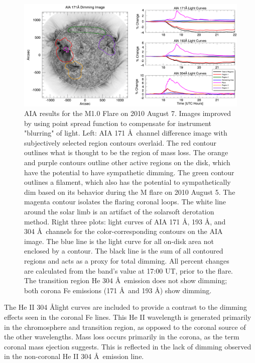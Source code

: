 \begin{figure}[!h]
    \begin{center}
	    \includegraphics[width=166mm]{Images/Aia2010Aug7.png}
    \end{center}
    \caption[AIA contour analysis for 2010 August 7 event]{
        AIA results for the M1.0 Flare on 2010 August 7. Images improved by using point spread function to compensate for 
        instrument "blurring" of light. Left: AIA 171 \AA\ channel difference image with subjectively 
        selected region contours overlaid. The red contour outlines what is thought to be the region of mass loss. The 
        orange and purple contours outline other active regions on the disk, which have the potential to have sympathetic 
        dimming. The green contour outlines a filament, which also has the potential to sympathetically dim based on its 
        behavior during the M flare on 2010 August 5. The magenta contour isolates the flaring coronal loops. The white line 
        around the solar limb is an artifact of the solarsoft derotation method. Right three plots: light curves of AIA 171 
        \AA, 193 \AA, and 304 \AA\ channels for the color-corresponding contours on the AIA image. The blue line is the 
        light curve for all on-disk area not enclosed by a contour. The black line is the sum of all contoured regions and 
        acts as a proxy for total dimming. All percent changes are calculated from the band’s value at 17:00 UT, prior to 
        the flare. The transition region He 304 \AA\ emission does not show dimming; both corona Fe emissions (171 \AA\ and 
        193 \AA) show dimming.
	}
    \label{aia2010aug7}
\end{figure}

The He II 304 \AA light curves are included to provide a contrast to the dimming effects seen in the coronal Fe lines. This He II wavelength is generated primarily in the chromosphere and transition region, as opposed to the coronal source of the other wavelengths. Mass loss occurs primarily in the corona, as the term coronal mass ejection suggests. This is reflected in the lack of dimming observed in the non-coronal He II 304 \AA\ emission line.

